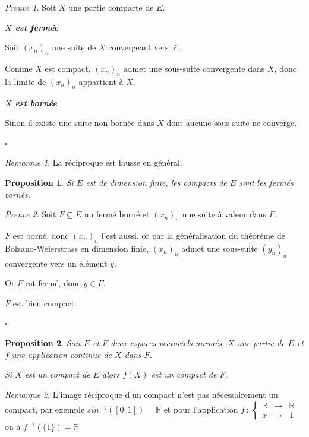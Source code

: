 \documentclass[]{article}
\newtheorem{myproposition}{Proposition}
\theoremstyle{remark}
\newtheorem{myrem}{Remarque}
\newtheorem{myproof}{Preuve}
\theoremstyle{definition}
\newcommand{\cqfd}{
	\hfill$\square$
}
\newcommand{\func}[5]{
#1 \, : \, \left\{ \begin{array}{lcl}
	#2 & \longrightarrow & #3 \\
	#4 & \longmapsto & #5
\end{array}
\right.
}
\newenvironment{proofpart}[1]{
	\leavevmode
	
	\noindent
	{\textit{\textbf{\boldmath #1}}}
	
}{
	\checkmark
}
\begin{document}
\begin{myproof}
	Soit $X$ une partie compacte de $E$.
	
	\begin{proofpart}{$X$ est fermée}
		Soit $(x_n)_n$ une suite de $X$ convergeant vers $\ell$.
		
		Comme $X$ est compact, $(x_n)_n$ admet une sous-suite convergente dans $X$, donc la limite de $(x_n)_n$ appartient à $X$.
	\end{proofpart}
	
	\begin{proofpart}{$X$ est bornée}
		Sinon il existe une suite non-bornée dans $X$ dont aucune sous-suite ne converge.
	\end{proofpart}
	
	\cqfd
\end{myproof}

\begin{myrem}
	La réciproque est fausse en général.
\end{myrem}

\begin{myproposition}
	Si $E$ est de dimension finie, les compacts de $E$ sont les fermés bornés.
\end{myproposition}

\begin{myproof}
	Soit $F \subseteq E$ un fermé borné et $(x_n)_n$ une suite à valeur dans $F$.
	
	$F$ est borné, donc $(x_n)_n$ l'est aussi, or par la généralisation du théorème de Bolzano-Weierstrass en dimension finie, $(x_n)_n$ admet une sous-suite $(y_n)_n$ convergente vers un élément $y$.
	
	Or $F$ est fermé, donc $y \in F$.
	
	$F$ est bien compact.
	
	\cqfd
\end{myproof}

\begin{myproposition}
	Soit $E$ et $F$ deux espaces vectoriels normés, $X$ une partie de $E$ et $f$ une application continue de $X$ dans $F$.
	
	Si $X$ est un compact de $E$ alors $f(X)$ est un compact de $F$.
\end{myproposition}

\begin{myrem}
	L'image réciproque d'un compact n'est pas nécessairement un compact, par exemple $sin^{-1}([0, 1])= \mathbb{R}$ et pour l'application $\func{f}{\mathbb{R}}{\mathbb{R}}{x}{1}$ on a  $f^{-1}(\{1\})=\mathbb{R}$
\end{myrem}
\end{document}
